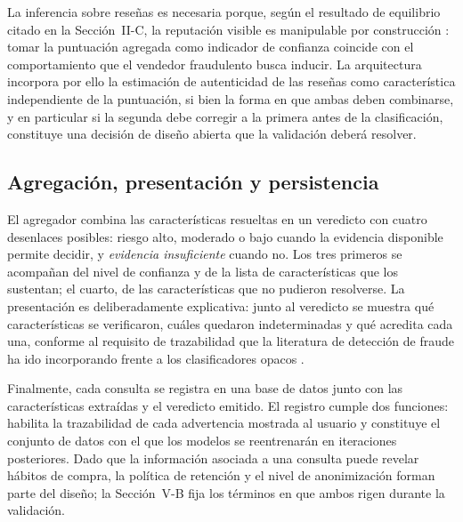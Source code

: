 La inferencia sobre reseñas es necesaria porque, según el resultado de equilibrio citado en
la Sección~II-C, la reputación visible es manipulable por construcción \cite{ref29}: tomar la
puntuación agregada como indicador de confianza coincide con el comportamiento que el vendedor
fraudulento busca inducir. La arquitectura incorpora por ello la estimación de autenticidad de
las reseñas como característica independiente de la puntuación, si bien la forma en que ambas
deben combinarse, y en particular si la segunda debe corregir a la primera antes de la
clasificación, constituye una decisión de diseño abierta que la validación deberá resolver.

\subsection{Agregación, presentación y persistencia}

El agregador combina las características resueltas en un veredicto con cuatro desenlaces
posibles: riesgo alto, moderado o bajo cuando la evidencia disponible permite decidir, y
\emph{evidencia insuficiente} cuando no. Los tres primeros se acompañan del nivel de confianza
y de la lista de características que los sustentan; el cuarto, de las características que no
pudieron resolverse. La presentación es deliberadamente explicativa: junto al veredicto se
muestra qué características se verificaron, cuáles quedaron indeterminadas y qué acredita cada
una, conforme al requisito de trazabilidad que la literatura de detección de fraude ha ido
incorporando frente a los clasificadores opacos \cite{ref28}.

Finalmente, cada consulta se registra en una base de datos junto con las características extraídas y
el veredicto emitido. El registro cumple dos funciones: habilita la trazabilidad de cada
advertencia mostrada al usuario y constituye el conjunto de datos con el que los modelos se
reentrenarán en iteraciones posteriores. Dado que la información asociada a una consulta puede
revelar hábitos de compra, la política de retención y el nivel de anonimización forman parte
del diseño; la Sección~V-B fija los términos en que ambos rigen durante la validación.
